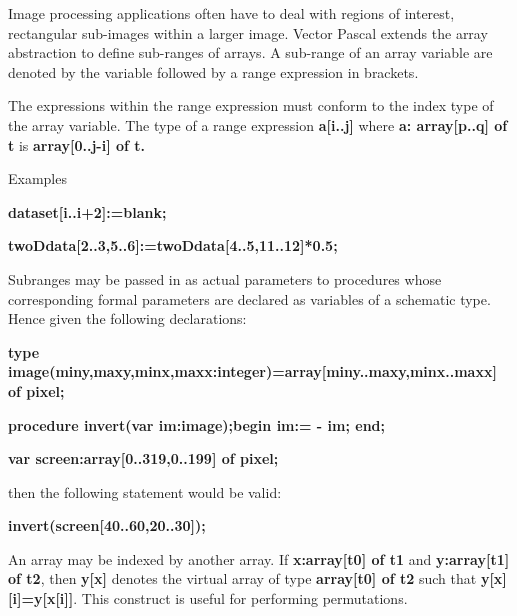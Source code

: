Image processing applications often have to deal with regions of interest, rectangular
sub-images within a larger image. Vector Pascal extends the array abstraction to
define sub-ranges of arrays. A sub-range  of an array variable are denoted by the variable followed
by a range expression in brackets.



The expressions within the range expression must conform to the index type of
the array variable. The type of a range expression \textbf{a{[}i..j{]}} where
\textbf{a: array{[}p..q{]} of t} is \textbf{array{[}0..j-i{]} of t.}

Examples

\textbf{dataset{[}i..i+2{]}:=blank;}

\textbf{twoDdata{[}2..3,5..6{]}:=twoDdata{[}4..5,11..12{]}{*}0.5;}

Subranges may be passed in as actual parameters to procedures whose corresponding
formal parameters are declared as variables of a schematic type. Hence given
the following declarations:

\textbf{type image(miny,maxy,minx,maxx:integer)=array{[}miny..maxy,minx..maxx{]}
of pixel;}

\textbf{procedure invert(var im:image);begin im:= - im; end;}

\textbf{var screen:array{[}0..319,0..199{]} of pixel;}

then the following statement would be valid:

\textbf{invert(screen{[}40..60,20..30{]});}



 An array may be indexed
by another array. If \textbf{x:array{[}t0{]} of t1} and \textbf{y:array{[}t1{]}
of t2}, then \textbf{y{[}x{]}} denotes the virtual array of type \textbf{array{[}t0{]}
of t2} such that \textbf{y{[}x{]}{[}i{]}=y{[}x{[}i{]}{]}}. This construct is
useful for performing permutations. 


